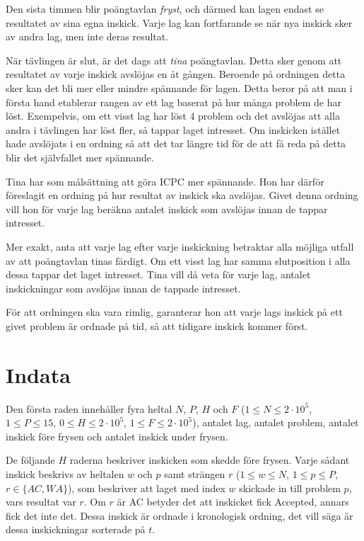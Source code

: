 Den sista timmen blir poängtavlan \textit{fryst}, och därmed kan lagen endast se resultatet av sina egna inskick.
Varje lag kan fortfarande se när nya inskick sker av andra lag, men inte deras resultat.

När tävlingen är slut, är det dags att \textit{tina} poängtavlan.
Detta sker genom att resultatet av varje inskick avslöjas en åt gången.
Beroende på ordningen detta sker kan det bli mer eller mindre spännande för lagen.
Detta beror på att man i första hand etablerar rangen av ett lag baserat på hur många problem de har löst.
Exempelvis, om ett visst lag har löst $4$ problem och det avslöjas att alla andra i tävlingen har löst fler,
så tappar laget intresset.
Om inskicken istället hade avslöjats i en ordning så att det tar längre tid för de att få reda på detta blir det självfallet mer spännande.

Tina har som målsättning att göra ICPC mer spännande.
Hon har därför föreslagit en ordning på hur resultat av inskick ska avslöjas.
Givet denna ordning vill hon för varje lag beräkna antalet inskick som avslöjas innan de tappar intresset.

Mer exakt, anta att varje lag efter varje inskickning betraktar alla möjliga utfall av att poängtavlan tinas färdigt.
Om ett visst lag har samma slutposition i alla dessa tappar det laget intresset.
Tina vill då veta för varje lag, antalet inskickningar som avslöjas innan de tappade intresset.

För att ordningen ska vara rimlig, garanterar hon att varje lags inskick på ett givet problem är ordnade på tid,
så att tidigare inskick kommer först.

\section*{Indata}
Den första raden innehåller fyra heltal $N$, $P$, $H$ och $F$
($1 \leq N \leq 2 \cdot 10^5$, $1 \leq P \leq 15$, $0 \leq H \leq 2 \cdot 10^5$, $1 \leq F \leq 2 \cdot 10^5$),
antalet lag, antalet problem, antalet inskick före frysen och antalet inskick under frysen.

De följande $H$ raderna beskriver inskicken som skedde före frysen.
Varje sådant inskick beskrivs av heltalen $w$ och $p$ samt strängen $r$
($1 \leq w \leq N$, $1 \leq p \leq P$, $r \in \{AC,WA\}$),
som beskriver att laget med index $w$ skickade in till problem $p$,
vars resultat var $r$. Om $r$ är AC betyder det att inskicket fick Accepted, annars fick det inte det.
Dessa inskick är ordnade i kronologisk ordning, det vill säga är dessa inskickningar sorterade på $t$.

